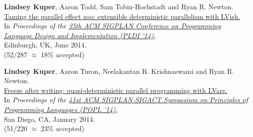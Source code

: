 \documentclass[10pt,letterpaper]{article}
\newenvironment{itemize*}
  {\begin{itemize}
      \setlength{\itemsep}{1pt}
      \setlength{\parskip}{3pt}
  }
  {\end{itemize}}
\begin{document}
\begin{itemize*}
\item
  \textbf{Lindsey Kuper}, Aaron Todd, Sam Tobin-Hochstadt and Ryan
  R. Newton. \\
  \href{http://www.cs.indiana.edu/~lkuper/papers/effectzoo-pldi14.pdf}{Taming
    the parallel effect zoo: extensible deterministic parallelism with
    LVish.} \\
  In \emph{Proceedings of the
    \href{http://conferences.inf.ed.ac.uk/pldi2014/}{35th ACM SIGPLAN
      Conference on Programming Language Design and Implementation
      (PLDI '14)}}, \\
  Edinburgh, UK, June 2014. \\
  (52/287 $\approx$ 18\% accepted)

\item
  \textbf{Lindsey Kuper}, Aaron Turon, Neelakantan R. Krishnaswami and
  Ryan R. Newton. \\
  \href{http://www.cs.indiana.edu/~lkuper/papers/lvish-popl14.pdf}{Freeze
    after writing: quasi-deterministic parallel programming with
    LVars.} \\
  In \emph{Proceedings of the
    \href{http://popl.mpi-sws.org/2014/}{41st ACM SIGPLAN-SIGACT
      Symposium on Principles of Programming Languages (POPL '14)}}, \\
  San Diego, CA, January 2014. \\
  (51/220 $\approx$ 23\% accepted)
\end{itemize*}
\end{document}
